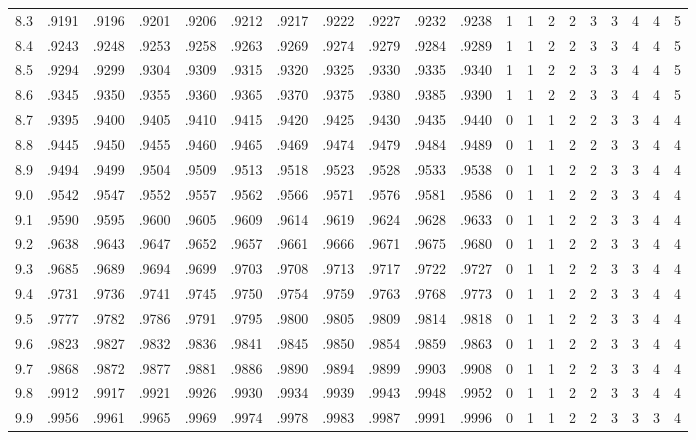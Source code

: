 {\begin{tabular}{|c|cccccccccc|ccccccccc|}
8.3 & .9191 & .9196 & .9201 & .9206 & .9212 & .9217 & .9222 & .9227 & .9232 & .9238 & 1 & 1 & 2 & 2 & 3 & 3 & 4 & 4 & 5 \\
8.4 & .9243 & .9248 & .9253 & .9258 & .9263 & .9269 & .9274 & .9279 & .9284 & .9289 & 1 & 1 & 2 & 2 & 3 & 3 & 4 & 4 & 5 \\
8.5 & .9294 & .9299 & .9304 & .9309 & .9315 & .9320 & .9325 & .9330 & .9335 & .9340 & 1 & 1 & 2 & 2 & 3 & 3 & 4 & 4 & 5 \\
8.6 & .9345 & .9350 & .9355 & .9360 & .9365 & .9370 & .9375 & .9380 & .9385 & .9390 & 1 & 1 & 2 & 2 & 3 & 3 & 4 & 4 & 5 \\
8.7 & .9395 & .9400 & .9405 & .9410 & .9415 & .9420 & .9425 & .9430 & .9435 & .9440 & 0 & 1 & 1 & 2 & 2 & 3 & 3 & 4 & 4 \\
8.8 & .9445 & .9450 & .9455 & .9460 & .9465 & .9469 & .9474 & .9479 & .9484 & .9489 & 0 & 1 & 1 & 2 & 2 & 3 & 3 & 4 & 4 \\
8.9 & .9494 & .9499 & .9504 & .9509 & .9513 & .9518 & .9523 & .9528 & .9533 & .9538 & 0 & 1 & 1 & 2 & 2 & 3 & 3 & 4 & 4 \\
9.0 & .9542 & .9547 & .9552 & .9557 & .9562 & .9566 & .9571 & .9576 & .9581 & .9586 & 0 & 1 & 1 & 2 & 2 & 3 & 3 & 4 & 4 \\
9.1 & .9590 & .9595 & .9600 & .9605 & .9609 & .9614 & .9619 & .9624 & .9628 & .9633 & 0 & 1 & 1 & 2 & 2 & 3 & 3 & 4 & 4 \\
9.2 & .9638 & .9643 & .9647 & .9652 & .9657 & .9661 & .9666 & .9671 & .9675 & .9680 & 0 & 1 & 1 & 2 & 2 & 3 & 3 & 4 & 4 \\
9.3 & .9685 & .9689 & .9694 & .9699 & .9703 & .9708 & .9713 & .9717 & .9722 & .9727 & 0 & 1 & 1 & 2 & 2 & 3 & 3 & 4 & 4 \\
9.4 & .9731 & .9736 & .9741 & .9745 & .9750 & .9754 & .9759 & .9763 & .9768 & .9773 & 0 & 1 & 1 & 2 & 2 & 3 & 3 & 4 & 4 \\
9.5 & .9777 & .9782 & .9786 & .9791 & .9795 & .9800 & .9805 & .9809 & .9814 & .9818 & 0 & 1 & 1 & 2 & 2 & 3 & 3 & 4 & 4 \\
9.6 & .9823 & .9827 & .9832 & .9836 & .9841 & .9845 & .9850 & .9854 & .9859 & .9863 & 0 & 1 & 1 & 2 & 2 & 3 & 3 & 4 & 4 \\
9.7 & .9868 & .9872 & .9877 & .9881 & .9886 & .9890 & .9894 & .9899 & .9903 & .9908 & 0 & 1 & 1 & 2 & 2 & 3 & 3 & 4 & 4 \\
9.8 & .9912 & .9917 & .9921 & .9926 & .9930 & .9934 & .9939 & .9943 & .9948 & .9952 & 0 & 1 & 1 & 2 & 2 & 3 & 3 & 4 & 4 \\
9.9 & .9956 & .9961 & .9965 & .9969 & .9974 & .9978 & .9983 & .9987 & .9991 & .9996 & 0 & 1 & 1 & 2 & 2 & 3 & 3 & 3 & 4 \\
\hline
\end{tabular}
\par}
\clearpage

